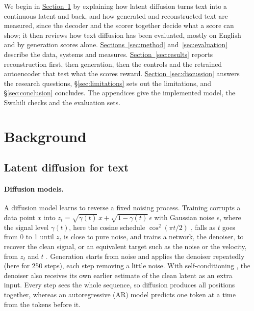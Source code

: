 \documentclass[11pt,a4paper]{article}
\begin{document}
We begin in \hyperref[sec:background]{Section~\ref*{sec:background}} by explaining how latent diffusion turns text into a continuous latent and back, and how generated and reconstructed text are measured, since the decoder and the scorer together decide what a score can show; it then reviews how text diffusion has been evaluated, mostly on English and by generation scores alone. \hyperref[sec:method]{Sections~\ref*{sec:method}} and~\ref{sec:evaluation} describe the data, systems and measures. \hyperref[sec:results]{Section~\ref*{sec:results}} reports reconstruction first, then generation, then the controls and the retrained autoencoder that test what the scores reward. \hyperref[sec:discussion]{Section~\ref*{sec:discussion}} answers the research questions, \S\ref{sec:limitations} sets out the limitations, and \S\ref{sec:conclusion} concludes. The appendices give the implemented model, the Swahili checks and the evaluation sets.

\section{Background}
\label{sec:background}

\subsection{Latent diffusion for text}

\paragraph{Diffusion models.} A diffusion model learns to reverse a fixed noising process. Training corrupts a data point $x$ into $z_t=\sqrt{\gamma(t)}\,x+\sqrt{1-\gamma(t)}\,\epsilon$ with Gaussian noise $\epsilon$, where the signal level $\gamma(t)$, here the cosine schedule $\cos^2(\pi t/2)$ \citep{nichol2021improved}, falls as $t$ goes from 0 to 1 until $z_t$ is close to pure noise, and trains a network, the denoiser, to recover the clean signal, or an equivalent target such as the noise or the velocity, from $z_t$ and $t$ \citep{ho2020denoising,salimans2022progressive}. Generation starts from noise and applies the denoiser repeatedly (here for 250 steps), each step removing a little noise. With self-conditioning \citep{chen2023analog}, the denoiser also receives its own earlier estimate of the clean latent as an extra input. Every step sees the whole sequence, so diffusion produces all positions together, whereas an autoregressive (AR) model predicts one token at a time from the tokens before it.
\end{document}

